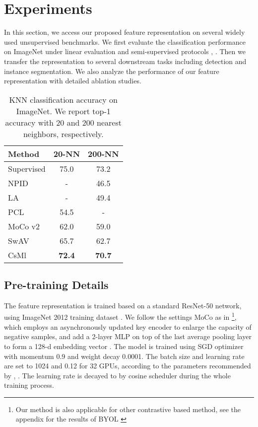 \documentclass[10pt,twocolumn,letterpaper]{article}
\begin{document}
\section{Experiments}
In this section, we access our proposed feature representation on several widely used unsupervised benchmarks. We first evaluate the classification performance on ImageNet under linear evaluation and semi-supervised protocols \cite{chen2020simple}, \cite{he2020momentum}. Then we transfer the representation to several downstream tasks including detection and instance segmentation. We also analyze the performance of our feature representation with detailed ablation studies.

\begin{table}[t]
\caption{KNN classification accuracy on ImageNet. We report top-1 accuracy with 20 and 200 nearest neighbors, respectively.}
\vspace{0.05in}
\renewcommand\arraystretch{1.2}
\centering
\setlength{\tabcolsep}{5mm}
\begin{tabular}{lcc}
\toprule
Method       & 20-NN    & 200-NN               \\
\midrule
Supervised   & 75.0     & 73.2                \\
\midrule
NPID \cite{wu2018unsupervised}        & -        & 46.5                 \\
LA\cite{zhuang2019local}           & -        & 49.4                 \\
PCL\cite{li2020prototypical}          & 54.5     & -                    \\
MoCo v2\cite{chen2020improved}      & 62.0     & 59.0                 \\
SwAV\cite{caron2020unsupervised}         & 65.7     & 62.7                 \\
\midrule
CsMl          & \textbf{72.4}     & \textbf{70.7} \\
\bottomrule
\end{tabular}
\label{tab: knn_acc}
\end{table}

\subsection{Pre-training Details}
The feature representation is trained based on a standard ResNet-50 \cite{he2016deep} network, using ImageNet 2012 training dataset \cite{deng2009imagenet}. We follow the settings MoCo as in \cite{he2020momentum} \footnote{Our method is also applicable for other contrastive based method, see the appendix for the results of BYOL \cite{grill2020bootstrap}}, which employs an asynchronously updated key encoder to enlarge the capacity of negative samples, and add a 2-layer MLP on top of the last average pooling layer to form a 128-d embedding vector \cite{chen2020improved}. The model is trained using SGD optimizer with momentum 0.9 and weight decay 0.0001. The batch size and learning rate are set to 1024 and 0.12 for 32 GPUs, according to the parameters recommended by \cite{chen2020improved}, \cite{goyal2017accurate}. The learning rate is decayed to  by cosine scheduler \cite{loshchilov2016sgdr} during the whole training process.
\end{document}
